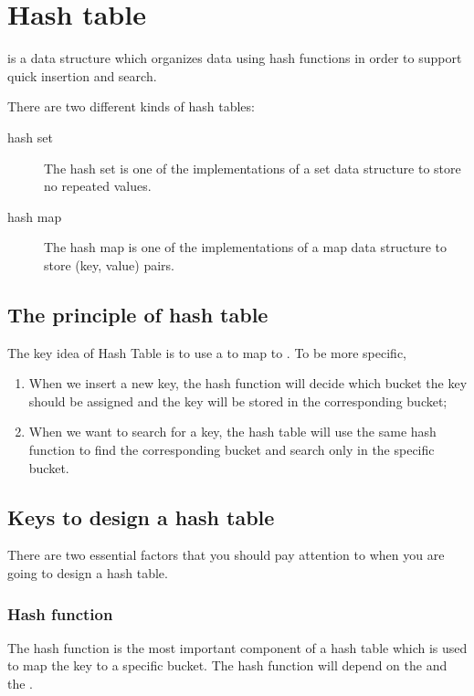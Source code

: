 
\chapter{Hash table}

 is a data structure which organizes data using hash functions in order to support quick insertion and search.

There are two different kinds of hash tables:
\begin{description}
\item[hash set] The hash set is one of the implementations of a set data structure to store no repeated values.
\item[hash map] The hash map is one of the implementations of a map data structure to store (key, value) pairs.
\end{description}

\section{The principle of hash table}

The key idea of Hash Table is to use a  to map  to . To be more specific,
\begin{enumerate}
\item When we insert a new key, the hash function will decide which bucket the key should be assigned and the key will be stored in the corresponding bucket;
\item When we want to search for a key, the hash table will use the same hash function to find the corresponding bucket and search only in the specific bucket.
\end{enumerate}


\section{Keys to design a hash table}

There are two essential factors that you should pay attention to when you are going to design a hash table.

\subsection{Hash function}

The hash function is the most important component of a hash table which is used to map the key to a specific bucket.
The hash function will depend on the  and the .


